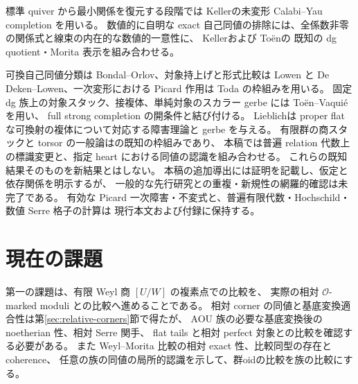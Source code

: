 \documentclass[11pt,a4paper]{ltjsarticle}
\theoremstyle{definition}\newtheorem{remark}[theorem]{注意}
\begin{document}
標準 quiver から最小関係を復元する段階では
Keller\cite[\S6.9, Theorem 6.10]{KellerCY}の未変形 Calabi--Yau completion を用いる。
数値的に自明な exact 自己同値の排除には、全係数非零の関係式と線束の内在的な数値的一意性に、
Keller\cite[\S4.4]{KellerDG}および To\"en\cite[Theorem 7.2(2), Corollary 7.6]{ToenMorita}の
既知の dg quotient・Morita 表示を組み合わせる。

可換自己同値分類は Bondal--Orlov、対象持上げと形式比較は Lowen と
De Deken--Lowen、一次変形における Picard 作用は Toda の枠組みを用いる。
固定 dg 族上の対象スタック、接複体、単純対象のスカラー gerbe には
To\"en--Vaqui\'e\cite[Corollaries 3.15, 3.17, 3.21, 3.22]{ToenVaquie}を用い、
full strong completion の開条件と結び付ける。
Lieblich\cite[Theorem 3.1.1, Corollary 4.3.3]{LieblichComplexes}は
proper flat な可換射の複体について対応する障害理論と gerbe を与える。
有限群の商スタックと torsor の一般論は\cite[Tag 04UV]{Stacks}の既知の枠組みであり、
本稿では普遍 relation 代数上の標識変更と、指定 heart における同値の認識を組み合わせる。
これらの既知結果そのものを新結果とはしない。
本稿の追加導出には証明を記載し、仮定と依存関係を明示するが、
一般的な先行研究との重複・新規性の網羅的確認は未完了である。
有効な Picard 一次障害・不変式と、普遍有限代数・Hochschild・数値 Serre 格子の計算は
現行本文および付録に保持する。



















\section{現在の課題}
第一の課題は、有限 Weyl 商 $[U/W]$ の複素点での比較を、
実際の相対 $\mathcal O$-marked moduli との比較へ進めることである。
相対 corner の同値と基底変換適合性は第\ref{sec:relative-corners}節で得たが、
AOU 族の必要な基底変換後の noetherian 性、相対 Serre 関手、
flat tails と相対 perfect 対象との比較を確認する必要がある。
また Weyl--Morita 比較の相対 exact 性、比較同型の存在と coherence、
任意の族の同値の局所的認識を示して、群oidの比較を族の比較にする。
\end{document}

